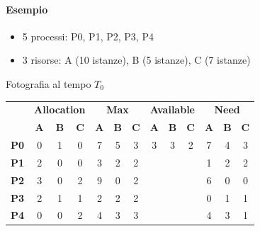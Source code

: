 \documentclass[a4paper]{article}
\begin{document}
\paragraph{Esempio}
\begin{itemize}
   \item 5 processi: P0, P1, P2, P3, P4
   \item 3 risorse: A (10 istanze), B (5 istanze), C (7 istanze)
\end{itemize}
Fotografia al tempo $T_0$
\begin{table}[htb]
   \centering
   \begin{tabular}{c|ccc|ccc|ccc|ccc|}
      \cline{2-13}
                                        & \multicolumn{3}{c|}{\textbf{Allocation}} & \multicolumn{3}{c|}{\textbf{Max}} & \multicolumn{3}{c|}{\textbf{Available}} & \multicolumn{3}{c|}{\textbf{Need}}                                                                                                         \\ \cline{2-13}
                                        & \textbf{A}                               & \textbf{B}                        & \textbf{C}                              & \textbf{A}                         & \textbf{B} & \textbf{C} & \textbf{A} & \textbf{B} & \textbf{C} & \textbf{A} & \textbf{B} & \textbf{C} \\ \hline
      \multicolumn{1}{|c|}{\textbf{P0}} & 0                                        & 1                                 & 0                                       & 7                                  & 5          & 3          & 3          & 3          & 2          & 7          & 4          & 3          \\
      \multicolumn{1}{|c|}{\textbf{P1}} & 2                                        & 0                                 & 0                                       & 3                                  & 2          & 2          &            &            &            & 1          & 2          & 2          \\
      \multicolumn{1}{|c|}{\textbf{P2}} & 3                                        & 0                                 & 2                                       & 9                                  & 0          & 2          &            &            &            & 6          & 0          & 0          \\
      \multicolumn{1}{|c|}{\textbf{P3}} & 2                                        & 1                                 & 1                                       & 2                                  & 2          & 2          &            &            &            & 0          & 1          & 1          \\
      \multicolumn{1}{|c|}{\textbf{P4}} & 0                                        & 0                                 & 2                                       & 4                                  & 3          & 3          &            &            &            & 4          & 3          & 1          \\ \hline
   \end{tabular}
\end{table}
\end{document}
